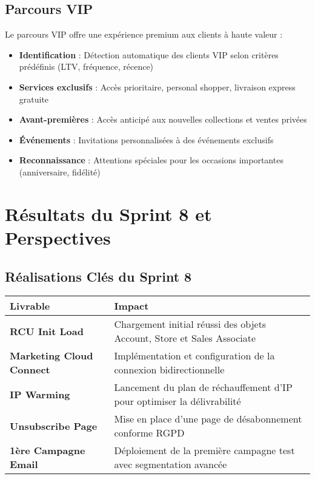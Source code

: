 \subsection{Parcours VIP}

Le parcours VIP offre une expérience premium aux clients à haute valeur :

\begin{itemize}
    \item \textbf{Identification} : Détection automatique des clients VIP selon critères prédéfinis (LTV, fréquence, récence)
    \item \textbf{Services exclusifs} : Accès prioritaire, personal shopper, livraison express gratuite
    \item \textbf{Avant-premières} : Accès anticipé aux nouvelles collections et ventes privées
    \item \textbf{Événements} : Invitations personnalisées à des événements exclusifs
    \item \textbf{Reconnaissance} : Attentions spéciales pour les occasions importantes (anniversaire, fidélité)
\end{itemize}

\section{Résultats du Sprint 8 et Perspectives}

\subsection{Réalisations Clés du Sprint 8}

\begin{center}
\begin{tabular}{|>{\bfseries}p{5cm}|p{8.5cm}|}
\hline
\rowcolor{lightblue} Livrable & Impact \\
\hline
RCU Init Load & Chargement initial réussi des objets Account, Store et Sales Associate \\
\hline
Marketing Cloud Connect & Implémentation et configuration de la connexion bidirectionnelle \\
\hline
IP Warming & Lancement du plan de réchauffement d'IP pour optimiser la délivrabilité \\
\hline
Unsubscribe Page & Mise en place d'une page de désabonnement conforme RGPD \\
\hline
1ère Campagne Email & Déploiement de la première campagne test avec segmentation avancée \\
\hline
\end{tabular}
\end{center}

